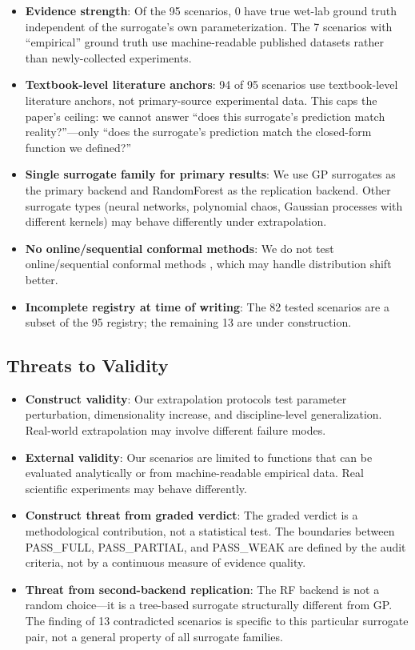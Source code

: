 \documentclass[journal]{IEEEtran}
\begin{document}
\begin{itemize}
    \item \textbf{Evidence strength}: Of the 95 scenarios, 0 have true wet-lab
    ground truth independent of the surrogate's own parameterization. The 7
    scenarios with ``empirical'' ground truth use machine-readable published
    datasets rather than newly-collected experiments.
    \item \textbf{Textbook-level literature anchors}: 94 of 95 scenarios use
    textbook-level literature anchors, not primary-source experimental data.
    This caps the paper's ceiling: we cannot answer ``does this surrogate's
    prediction match reality?''---only ``does the surrogate's prediction match
    the closed-form function we defined?''
    \item \textbf{Single surrogate family for primary results}: We use GP
    surrogates as the primary backend and RandomForest as the replication
    backend. Other surrogate types (neural networks, polynomial chaos,
    Gaussian processes with different kernels) may behave differently under
    extrapolation.
    \item \textbf{No online/sequential conformal methods}: We do not test
    online/sequential conformal methods \cite{angelopoulos2022confidence},
    which may handle distribution shift better.
    \item \textbf{Incomplete registry at time of writing}: The 82 tested
    scenarios are a subset of the 95 registry; the remaining 13 are under
    construction.
\end{itemize}

\subsection{Threats to Validity}

\begin{itemize}
    \item \textbf{Construct validity}: Our extrapolation protocols test
    parameter perturbation, dimensionality increase, and discipline-level
    generalization. Real-world extrapolation may involve different failure
    modes.
    \item \textbf{External validity}: Our scenarios are limited to functions
    that can be evaluated analytically or from machine-readable empirical data.
    Real scientific experiments may behave differently.
    \item \textbf{Construct threat from graded verdict}: The graded verdict is
    a methodological contribution, not a statistical test. The boundaries
    between PASS\_FULL, PASS\_PARTIAL, and PASS\_WEAK are defined by the
    audit criteria, not by a continuous measure of evidence quality.
    \item \textbf{Threat from second-backend replication}: The RF backend is
    not a random choice---it is a tree-based surrogate structurally different
    from GP. The finding of 13 contradicted scenarios is specific to this
    particular surrogate pair, not a general property of all surrogate
    families.
\end{itemize}
\end{document}
